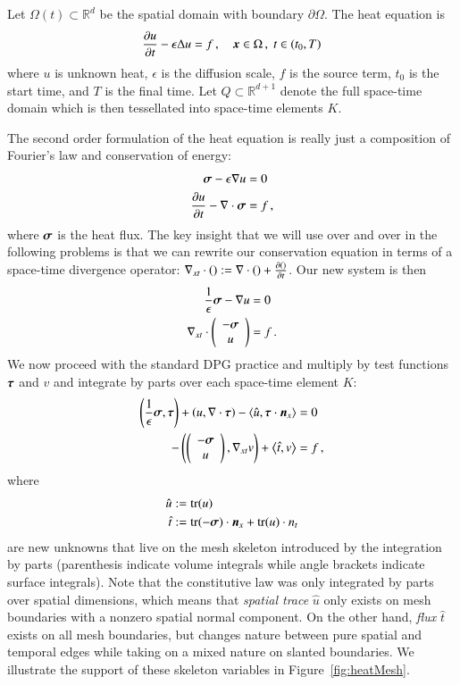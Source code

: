 \documentclass[preprint,12pt]{elsarticle}
\begin{document}
Let $\Omega(t)\subset\mathbb{R}^d$ be the spatial domain with boundary $\partial\Omega$.
The heat equation is
\begin{equation}
	\frac{\partial u}{\partial t}-\epsilon\Delta u=f\,,\quad\boldsymbol x\in\Omega\,,\;t\in(t_0,T)
\end{equation}
where $u$ is unknown heat, $\epsilon$ is the diffusion scale, $f$ is the source term, $t_0$ is the start time, and $T$ is the final time.
Let $Q\subset\mathbb{R}^{d+1}$ denote the full space-time domain which is then tessellated into space-time elements $K$.

The second order formulation of the heat equation is really just a composition of Fourier's law and conservation of energy:
\begin{equation}
\label{eq:heatFirstOrder}
\begin{aligned}
\boldsymbol\sigma-\epsilon\nabla u&=0\\
\frac{\partial u}{\partial t}-\nabla\cdot\boldsymbol\sigma&=f\,,
\end{aligned}
\end{equation}
where $\boldsymbol\sigma$ is the heat flux.
The key insight that we will use over and over in the following problems is that we can rewrite our conservation equation
in terms of a space-time divergence operator: $\nabla_{xt}\cdot():=\nabla\cdot()+\frac{\partial()}{\partial t}$.
Our new system is then
\begin{equation}
\label{eq:heatFirstOrderSpaceTime}
\begin{aligned}
\frac{1}{\epsilon}\boldsymbol\sigma-\nabla u&=0\\
\nabla_{xt}\cdot\left( \begin{array}{c} -\boldsymbol\sigma\\ u\\ \end{array} \right)&=f\,.
\end{aligned}
\end{equation}
We now proceed with the standard DPG practice and multiply by test functions $\boldsymbol\tau$ and $v$ 
and integrate by parts over each space-time element $K$:
\begin{equation}
\label{eq:heatBF}
\begin{aligned}
\left( \frac{1}{\epsilon}\boldsymbol\sigma,\boldsymbol\tau \right)+\left( u,\nabla\cdot\boldsymbol\tau \right)-\left\langle \hat u,\boldsymbol\tau\cdot\boldsymbol n_x \right\rangle&=0\\
-\left( \left( \begin{array}{c} -\boldsymbol\sigma\\ u\\ \end{array} \right),\nabla_{xt} v \right)+\left\langle \hat t,v \right\rangle&=f\,,
\end{aligned}
\end{equation}
where
\begin{align*}
\hat u&:=\operatorname*{tr}(u)\\
\hat t&:=\operatorname*{tr}(-\boldsymbol\sigma)\cdot\boldsymbol n_x+\operatorname*{tr}(u)\cdot n_t
\end{align*}
are new unknowns that live on the mesh skeleton introduced by the integration by parts 
(parenthesis indicate volume integrals while angle brackets indicate surface integrals).
Note that the constitutive law was only integrated by parts over spatial dimensions, which means 
that \emph{spatial trace} $\hat u$ only exists on mesh boundaries with a nonzero spatial normal component.
On the other hand, \emph{flux} $\hat t$ exists on all mesh boundaries, but changes nature between pure spatial and temporal edges while taking on 
a mixed nature on slanted boundaries. We illustrate the support of these skeleton variables in Figure~\ref{fig:heatMesh}.
\end{document}

